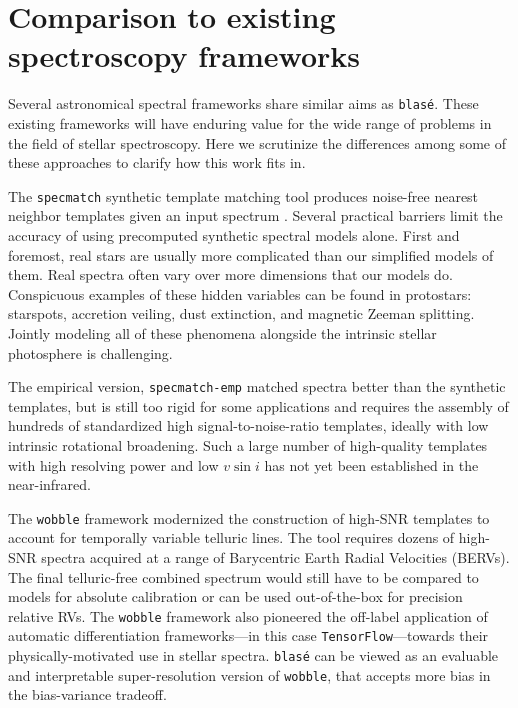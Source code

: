 \documentclass[twocolumn]{aastex631}
\begin{document}
\section{Comparison to existing spectroscopy frameworks}
Several astronomical spectral frameworks share similar aims as \texttt{blas\'e}.  These existing frameworks will have enduring value for the wide range of problems in the field of stellar spectroscopy.  Here we scrutinize the differences among some of these approaches to clarify how this work fits in.

The \texttt{specmatch} synthetic template matching tool produces noise-free nearest neighbor templates given an input spectrum \citep{2015PhDT........82P}.  Several practical barriers limit the accuracy of using precomputed synthetic spectral models alone. First and foremost, real stars are usually more complicated than our simplified models of them. Real spectra often vary over more dimensions that our models do.  Conspicuous examples of these hidden variables can be found in protostars: starspots, accretion veiling, dust extinction, and magnetic Zeeman splitting. Jointly modeling all of these phenomena alongside the intrinsic stellar photosphere is challenging.


The empirical version, \texttt{specmatch-emp} \citep{2017ApJ...836...77Y} matched spectra better than the synthetic templates, but is still too rigid for some applications and requires the assembly of hundreds of standardized high signal-to-noise-ratio templates, ideally with low intrinsic rotational broadening.  Such a large number of high-quality templates with high resolving power and low $v\sin{i}$ has not yet been established in the near-infrared.

The \texttt{wobble} framework \citep{2019AJ....158..164B} modernized the construction of high-SNR templates to account for temporally variable telluric lines. The tool requires dozens of high-SNR spectra acquired at a range of Barycentric Earth Radial Velocities (BERVs).  The final telluric-free combined spectrum would still have to be compared to models for absolute calibration or can be used out-of-the-box for precision relative RVs.  The \texttt{wobble} framework also pioneered the off-label application of automatic differentiation frameworks---in this case \texttt{TensorFlow}---towards their physically-motivated use in stellar spectra.  \texttt{blas\'e} can be viewed as an evaluable and interpretable super-resolution version of \texttt{wobble}, that accepts more bias in the bias-variance tradeoff.
\end{document}
